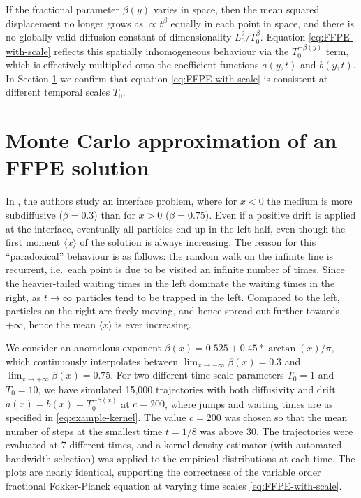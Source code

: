 \documentclass[a4paper,12pt]{elsarticle}
\numberwithin{equation}{section}
\theoremstyle{plain}
\theoremstyle{definition}
\theoremstyle{remark}
\numberwithin{equation}{section}
\newcommand{\1}{\mathbf 1}
\begin{document}
If the fractional parameter $\beta(y)$ varies in space, then the mean squared displacement no longer grows as $\propto t^\beta$ equally in each point in space, and 
there is no globally valid diffusion constant of dimensionality $L_0^2 / T_0^\beta$.  
Equation
\eqref{eq:FFPE-with-scale} reflects this spatially inhomogeneous behaviour
via the $T_0^{-\beta(y)}$ term, which is effectively multiplied onto the
coefficient functions $a(y,t)$ and $b(y,t)$.  In Section \ref{sec:examples}
we confirm that equation \eqref{eq:FFPE-with-scale} is consistent at 
different temporal scales $T_0$. 


\section{Monte Carlo approximation of an FFPE solution}
\label{sec:examples}

In \cite{Korabel2010}, the authors study an interface problem, where for $x<0$ the medium is more subdiffusive ($\beta = 0.3$) than for $x>0$ ($\beta = 0.75$).  Even if a positive drift is applied at the interface, eventually all particles end up in the left half, even though the first moment $\langle x \rangle$ of the solution is always increasing. The reason for this ``paradoxical'' behaviour is as follows: the random walk on the infinite line is recurrent, i.e.\ each point is due to be visited an infinite number of times. Since the heavier-tailed waiting times in the left dominate the waiting times in the right, as $t \to \infty$ particles tend to be trapped in the left. Compared to the left, particles on the right are freely moving, and hence spread out further towards $+\infty$, hence the mean $\langle x \rangle$ is ever increasing. 

We consider an anomalous exponent $\beta(x) = 0.525 + 0.45 * \arctan(x)/ \pi$, which continuously interpolates between $\lim_{x \to -\infty} \beta(x) = 0.3$ 
and $\lim_{x \to +\infty} \beta(x) = 0.75$.
For two different time scale parameters $T_0 = 1$ and $T_0 = 10$, we have simulated 15,000 trajectories \cite{var-order-MC} with both diffusivity and drift $a(x) = b(x) = T_0^{-\beta(x)}$
at $c = 200$, where jumps and waiting times are as specified in \eqref{eq:example-kernel}. The value $c = 200$ was chosen so that the mean number of steps at the smallest time $t = 1/8$ was above $30$. The trajectories were evaluated at 7 different times, and a kernel density estimator (with automated bandwidth selection) was applied
to the empirical distributions at each time.  The plots are nearly identical, supporting the correctness of the variable order fractional Fokker-Planck equation at varying time scales \eqref{eq:FFPE-with-scale}. 
\end{document}
